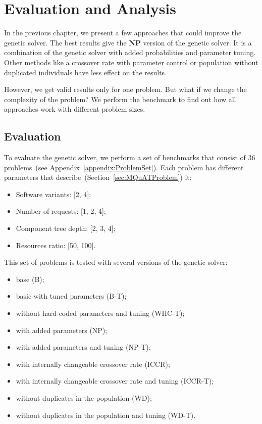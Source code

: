 \chapter{Evaluation and Analysis}
\label{chapter:evaluationAnalysis}

In the previous chapter, we present a few approaches that could improve the genetic solver.
The best results give the \textbf{NP} version of the genetic solver. It is a combination of the genetic solver with added probabilities and parameter tuning.
Other methods like a crossover rate with parameter control or population without duplicated individuals have less effect on the results.

However, we get valid results only for one problem. But what if we change the complexity of the problem? We perform the benchmark to find out how all approaches work with different problem sizes. 

\section{Evaluation}
\label{sec:evaluation}

To evaluate the genetic solver, we perform a set of benchmarks that consist of 36 problems~(see Appendix~\ref{appendix:ProblemSet}). Each problem has different parameters that describe~(Section~\ref{sec:MQuATProblem}) it:

\begin{itemize}
	\item Software variants: [2, 4];
	\item Number of requests: [1, 2, 4];
	\item Component tree depth: [2, 3, 4];
	\item Resources ratio: [50, 100].
\end{itemize}

This set of problems is tested with several versions of the genetic solver:

\begin{itemize}
	\item base (B);
	\item basic with tuned parameters (B-T);
	\item without hard-coded parameters and tuning (WHC-T);
	\item with added parameters (NP);
	\item with added parameters and tuning (NP-T);
	\item with internally changeable crossover rate (ICCR);
	\item with internally changeable crossover rate and tuning (ICCR-T);
	\item without duplicates in the population (WD);
	\item without duplicates in the population and tuning (WD-T).
\end{itemize}

